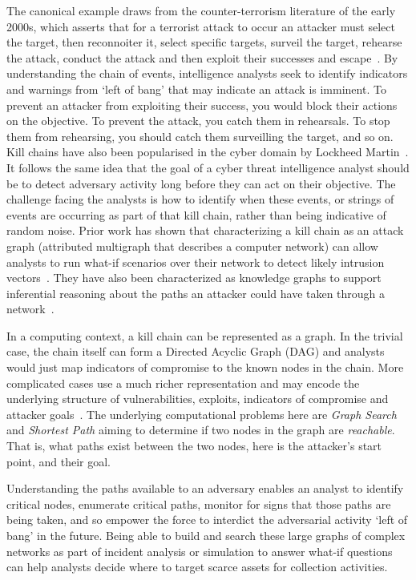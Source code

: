 The canonical example draws from the counter-terrorism literature of the early 2000s, which asserts that for a terrorist attack to occur an attacker must select the target, then reconnoiter it, select specific targets, surveil the target, rehearse the attack, conduct the attack and then exploit their successes and escape~\cite{Tradoc2007}.
By understanding the chain of events, intelligence analysts seek to identify indicators and warnings from `left of bang' that may indicate an attack is imminent. 
To prevent an attacker from exploiting their success, you would block their actions on the objective. 
To prevent the attack, you catch them in rehearsals. 
To stop them from rehearsing, you should catch them surveilling the target, and so on.
Kill chains have also been popularised in the cyber domain by Lockheed Martin~\cite{Hutchins2011}.
It follows the same idea that the goal of a cyber threat intelligence analyst should be to detect adversary activity long before they can act on their objective. 
The challenge facing the analysts is how to identify when these events, or strings of events are occurring as part of that kill chain, rather than being indicative of random noise.
Prior work has shown that characterizing a kill chain as an attack graph (attributed multigraph that describes a computer network) can allow analysts to run what-if scenarios over their network to detect likely intrusion vectors~\cite{Sadlek2022}.
They have also been characterized as knowledge graphs to support inferential reasoning about the paths an attacker could have taken through a network~\cite{Osullivan2015}.

In a computing context, a kill chain can be represented as a graph. 
In the trivial case, the chain itself can form a Directed Acyclic Graph (DAG) and analysts would just map indicators of compromise to the known nodes in the chain. 
More complicated cases use a much richer representation and may encode the underlying structure of vulnerabilities, exploits, indicators of compromise and attacker goals~\cite{Barnum2012}.
The underlying computational problems here are \textit{Graph Search} and \textit{Shortest Path} aiming to determine if two nodes in the graph are \textit{reachable}. 
That is, what paths exist between the two nodes, here is the attacker's start point, and their goal. 

Understanding the paths available to an adversary enables an analyst to identify critical nodes, enumerate critical paths, monitor for signs that those paths are being taken, and so empower the force to interdict the adversarial activity `left of bang' in the future. 
Being able to build and search these large graphs of complex networks as part of incident analysis or simulation to answer what-if questions can help analysts decide where to target scarce assets for collection activities. 

